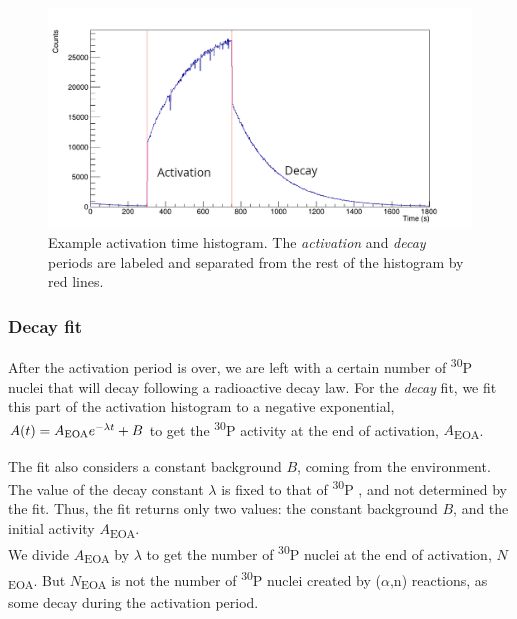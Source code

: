 \documentclass[a4paper,12pt]{report}
\newcommand{\an}{($\alpha$,n) }
\newcommand{\Piso}{\textsuperscript{30}P }
\begin{document}
\begin{figure}[H]
	\centering
	\includegraphics[width=\textwidth]{example_activation_time_histogram.png}
	\caption{Example activation time histogram.
	The \textit{activation} and \textit{decay} periods are labeled and separated from the rest of the histogram by red lines.}
	\label{example_activation_time_histogram}
\end{figure}

\subsubsection{Decay fit}
After the activation period is over, we are left with a certain number of \Piso nuclei that will decay following a radioactive decay law.
For the \textit{decay} fit, we fit this part of the activation histogram to a negative exponential, $A(t) = A\textsubscript{EOA} e^{-\lambda t} + B$ to get the \Piso activity at the end of activation, $A$\textsubscript{EOA}.

The fit also considers a constant background $B$, coming from the environment.
The value of the decay constant $\lambda$ is fixed to that of \Piso, and not determined by the fit.
Thus, the fit returns only two values: the constant background $B$, and the initial activity $A$\textsubscript{EOA}.
\\

We divide $A$\textsubscript{EOA} by $\lambda$ to get the number of \Piso nuclei at the end of activation, $N$\textsubscript{EOA}.
But $N$\textsubscript{EOA} is not the number of \Piso nuclei created by \an reactions, as some decay during the activation period.
\end{document}
